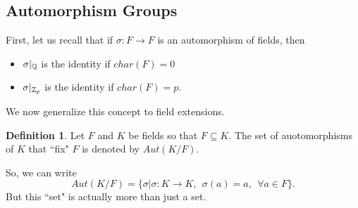 \documentclass[12pt]{article}
\theoremstyle{plain}
\theoremstyle{definition}
\newtheorem{definition}{Definition}
\theoremstyle{remark}
\begin{document}
 \subsection{Automorphism Groups}
 First, let us recall that if $\sigma:F\rightarrow F$ is an automorphism of fields, then
 \begin{itemize}
     \item $\sigma|_{\mathbb{Q}}$ is the identity if $char(F)=0$
     \item $\sigma|_{\mathbb{Z}_p}$ is the identity if $char(F)=p$.
 \end{itemize}
We now generalize this concept to field extensions.
\begin{definition}
Let $F$ and $K$ be fields so that $F\subseteq K$. The set of auotomorphisms of $K$ that ``fix" $F$ is denoted by $Aut(K/F)$.
\end{definition}
So, we can write
$$Aut(K/F) = \{\sigma|\sigma :K\rightarrow K, \:\:\sigma(a)=a, \:\:\forall a\in F\}.$$
But this ``set" is actually more than just a set.
\end{document}
